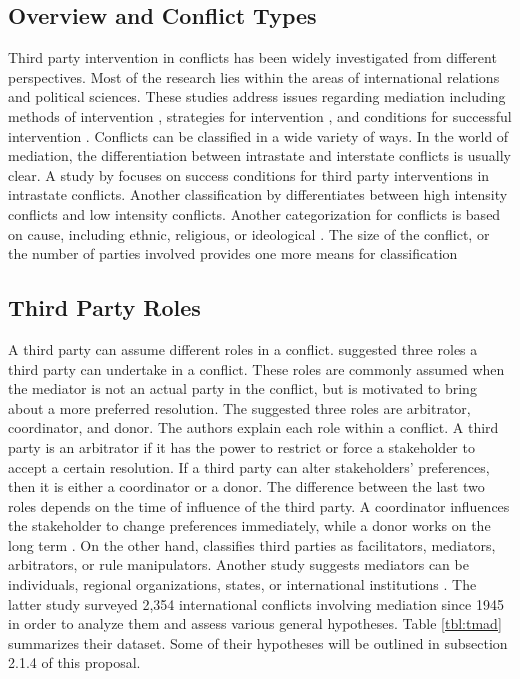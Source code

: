 \documentclass[letterpaper,12pt,titlepage,oneside,final]{book}
\begin{document}
\subsection{Overview and Conflict Types}
\label{sec:ovrct}
Third party intervention in conflicts has been widely investigated from different perspectives. Most of the research lies within the areas of international relations and political sciences. These studies address  issues regarding mediation including methods of intervention \citep{fisher2001}, strategies for intervention \citep{prein1987}, and conditions for successful intervention \citep{regan1996}. 
Conflicts can be classified in a wide variety of ways. In the world of mediation, the differentiation between intrastate and interstate conflicts is usually clear. A study by \citet{regan1996} focuses on success conditions for third party interventions in intrastate conflicts. Another classification by \citet{bercovitch2006} differentiates between high intensity conflicts and low intensity conflicts. Another categorization for conflicts is based on cause, including ethnic, religious, or ideological \citep{regan1996}.  The size of the conflict, or the number of parties involved provides one more means for classification \citep{jehn1997}

\subsection{Third Party Roles}
\label{sec:tproles}
A third party can assume different roles in a conflict. \citet{sakamoto2005} suggested three roles a third party can undertake in a conflict. These roles are commonly assumed when the mediator is not an actual party in the conflict, but is motivated to bring about a more preferred resolution. The suggested three roles are arbitrator, coordinator, and donor. The authors explain each role within a conflict. A third party is an arbitrator if it has the power to restrict or force a stakeholder to accept a certain resolution. If a third party can alter stakeholders' preferences, then it is either a coordinator or a donor. The difference between the last two roles depends on the time of influence of the third party. A coordinator influences the stakeholder to change preferences immediately, while a donor works on the long term \citep{sakamoto2005}. On the other hand, \citet{raiffa1982} classifies third parties as facilitators, mediators, arbitrators, or rule manipulators. Another study suggests mediators can be individuals, regional organizations, states, or international institutions \citep{bercovitch2000,bercovitch2006}. The latter study surveyed 2,354 international conflicts involving mediation since 1945 in order to analyze them and assess various general hypotheses. Table \ref{tbl:tmad} summarizes their dataset. Some of their hypotheses will be outlined in subsection 2.1.4 of this proposal. 
\end{document}
